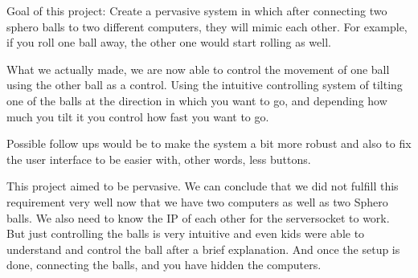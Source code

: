 Goal of this project:
Create a pervasive system in which after connecting two sphero balls to two different computers, they will mimic each other. For example, if you roll one ball away, the other one would start rolling as well.\bigskip

What we actually made, we are now able to control the movement of one ball using the other ball as a control. Using the intuitive controlling system of tilting one of the balls at the direction in which you want to go, and depending how much you tilt it you control how fast you want to go. \bigskip

Possible follow ups would be to make the system a bit more robust and also to fix the user interface to be easier with, other words, less buttons. \bigskip

This project aimed to be pervasive. We can conclude that we did not fulfill this requirement very well now that we have two computers as well as two Sphero balls. We also need to know the IP of each other for the serversocket to work. But just controlling the balls is very intuitive and even kids were able to understand and control the ball after a brief explanation. And once the setup is done, connecting the balls, and you have hidden the computers.
